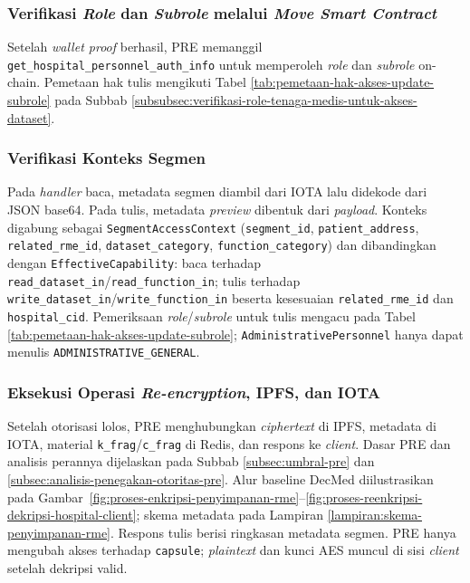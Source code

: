 \subsubsection{Verifikasi \textit{Role} dan \textit{Subrole} melalui \textit{Move Smart Contract}}
\label{subsec:validasi-role-subrole-move-smart-contract}

Setelah \textit{wallet proof} berhasil, PRE memanggil \texttt{get\_hospital\_personnel\_auth\_info} untuk memperoleh \textit{role} dan \textit{subrole} on-chain. Pemetaan hak tulis mengikuti Tabel \ref{tab:pemetaan-hak-akses-update-subrole} pada Subbab \ref{subsubsec:verifikasi-role-tenaga-medis-untuk-akses-dataset}.

\subsubsection{Verifikasi Konteks Segmen}
\label{subsec:verifikasi-konteks-segmen}

Pada \textit{handler} baca, metadata segmen diambil dari IOTA lalu didekode dari JSON base64. Pada tulis, metadata \textit{preview} dibentuk dari \textit{payload}. Konteks digabung sebagai \texttt{SegmentAccessContext} (\texttt{segment\_id}, \texttt{patient\_address}, \texttt{related\_rme\_id}, \texttt{dataset\_category}, \texttt{function\_category}) dan dibandingkan dengan \texttt{EffectiveCapability}: baca terhadap \texttt{read\_dataset\_in}/\texttt{read\_function\_in}; tulis terhadap \texttt{write\_dataset\_in}/\texttt{write\_function\_in} beserta kesesuaian \texttt{related\_rme\_id} dan \texttt{hospital\_cid}. Pemeriksaan \textit{role}/\textit{subrole} untuk tulis mengacu pada Tabel \ref{tab:pemetaan-hak-akses-update-subrole}; \texttt{AdministrativePersonnel} hanya dapat menulis \texttt{ADMINISTRATIVE\_GENERAL}.

\subsubsection{Eksekusi Operasi \textit{Re-encryption}, IPFS, dan IOTA}
\label{subsec:eksekusi-operasi-re-encryption-ipfs-iota}

Setelah otorisasi lolos, PRE menghubungkan \textit{ciphertext} di IPFS, metadata di IOTA, material \texttt{k\_frag}/\texttt{c\_frag} di Redis, dan respons ke \textit{client}. Dasar PRE dan analisis perannya dijelaskan pada Subbab \ref{subsec:umbral-pre} dan \ref{subsec:analisis-penegakan-otoritas-pre}. Alur baseline DecMed diilustrasikan pada Gambar~\ref{fig:proses-enkripsi-penyimpanan-rme}--\ref{fig:proses-reenkripsi-dekripsi-hospital-client}; skema metadata pada Lampiran \ref{lampiran:skema-penyimpanan-rme}. Respons tulis berisi ringkasan metadata segmen. PRE hanya mengubah akses terhadap \texttt{capsule}; \textit{plaintext} dan kunci AES muncul di sisi \textit{client} setelah dekripsi valid.

